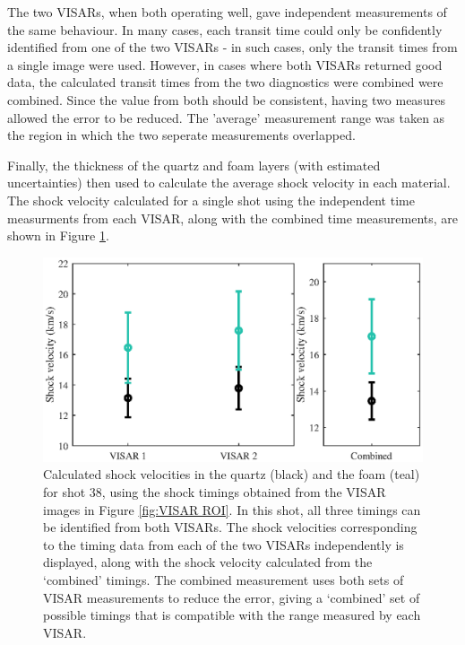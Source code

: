 The two VISARs, when both operating well, gave independent measurements of the same behaviour. In many cases, each transit time could only be confidently identified from one of the two VISARs - in such cases, only the transit times from a single image were used. However, in cases where both VISARs returned good data, the calculated transit times from the two diagnostics were combined were combined. Since the value from both should be consistent, having two measures allowed the error to be reduced. The 'average' measurement range was taken as the region in which the two seperate measurements overlapped.

Finally, the thickness of the quartz and foam layers (with estimated uncertainties) then used to calculate the average shock velocity in each material. The shock velocity calculated for a single shot using the independent time measurments from each VISAR, along with the combined time measurements, are shown in Figure \ref{fig:VISAR Timing}.

\begin{figure} [h]
\begin{centering}
\includegraphics[width=1.0\textwidth]{figures/Experiment/VISARTiming.eps}%
\caption{\label{fig:VISAR Timing} Calculated shock velocities in the quartz (black) and the foam (teal)  for shot 38, using the shock timings obtained from the VISAR images in Figure \ref{fig:VISAR ROI}. In this shot, all three timings can be identified from both VISARs. The shock velocities corresponding to the timing data from each of the two VISARs independently is displayed, along with the shock velocity calculated from the `combined' timings. The combined measurement uses both sets of VISAR measurements to reduce the error, giving a `combined' set of possible timings that is compatible with the range measured by each VISAR.}
\end{centering}
\end{figure}

